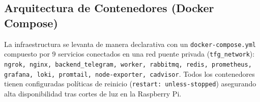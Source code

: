 \subsection{Arquitectura de Contenedores (Docker Compose)}
La infraestructura se levanta de manera declarativa con un \texttt{docker-compose.yml} compuesto por 9 servicios conectados en una red puente privada (\texttt{tfg\_network}):
\texttt{ngrok, nginx, backend\_telegram, worker, rabbitmq, redis, prometheus, grafana, loki, promtail, node-exporter, cadvisor}.
Todos los contenedores tienen configuradas políticas de reinicio (\texttt{restart: unless-stopped}) asegurando alta disponibilidad tras cortes de luz en la Raspberry Pi.
